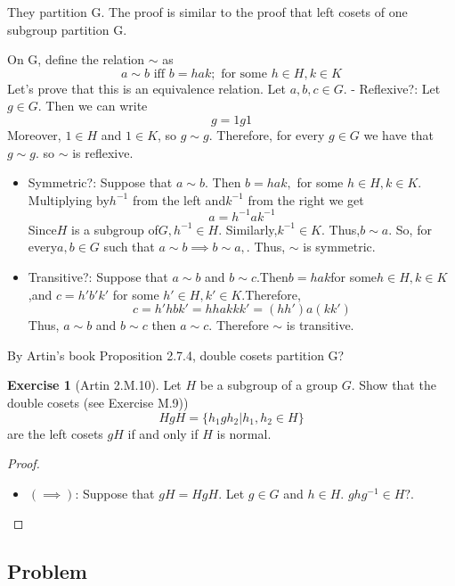 \documentclass[
]{book}
\providecommand{\tightlist}{%
  \setlength{\itemsep}{0pt}\setlength{\parskip}{0pt}}
\theoremstyle{definition}
\theoremstyle{definition}
\theoremstyle{definition}
\newtheorem{exercise}{Exercise}[chapter]
\theoremstyle{definition}
\theoremstyle{remark}
\begin{document}
They partition G. The proof is similar to the proof that left cosets of one subgroup partition G.

On G, define the relation \(\sim\) as
\[ a \sim b \text{ iff } b = hak; \text{ for some } h \in H, k \in K\]
Let's prove that this is an equivalence relation.
Let \(a,b,c\in G\).
- Reflexive?:
Let \(g \in G\). Then we can write
\[ g = 1g1\]
Moreover, \(1 \in H\) and \(1 \in K\), so \(g \sim g\).
Therefore, for every \(g \in G\) we have that \(g \sim g\). so \(\sim\) is reflexive.

\begin{itemize}
\item
  Symmetric?:
  Suppose that \(a \sim b.\) Then \(b = hak,\) for some \(h \in H, k \in K.\) Multiplying by\(h^{-1}\) from the left and\(k^{-1}\) from the right we get
  \[ a = h^{-1}ak^{-1}\]
  Since\(H\) is a subgroup of\(G,h^{-1} \in H.\) Similarly,\(k^{-1} \in K.\) Thus,\(b \sim a.\)
  So, for every\(a,b \in G\) such that \(a \sim b\implies b \sim a,\). Thus, \(\sim\) is symmetric.
\item
  Transitive?:
  Suppose that \(a \sim b\) and \(b \sim c\).Then\(b = hak\)for some\(h \in H,k \in K\),and \(c=h'b'k'\) for some \(h' \in H,k' \in K\).Therefore,
  \[c=h'hbk'=hhakkk'= (hh')a(kk')\]
  Thus, \(a\sim b\) and \(b\sim c\) then \(a\sim c\). Therefore \(\sim\) is transitive.
\end{itemize}

By Artin's book Proposition 2.7.4, double cosets partition G?

\begin{exercise}[Artin 2.M.10]
\protect\hypertarget{exr:unnamed-chunk-246}{}\label{exr:unnamed-chunk-246}Let \(H\) be a subgroup of a group \(G\). Show that the double cosets (see Exercise M.9))
\[HgH = \{h_1gh_2 | h_1, h_2 \in H\}\]
are the left cosets \(gH\) if and only if \(H\) is normal.
\end{exercise}

\begin{proof}
\leavevmode

\begin{itemize}
\tightlist
\item
  \((\implies)\): Suppose that \(gH=HgH\). Let \(g\in G\) and \(h\in H\).
  \(ghg^{-1}\in H?\).
\end{itemize}

\end{proof}

\hypertarget{problem-3}{%
\subsection{Problem}\label{problem-3}}
\end{document}
